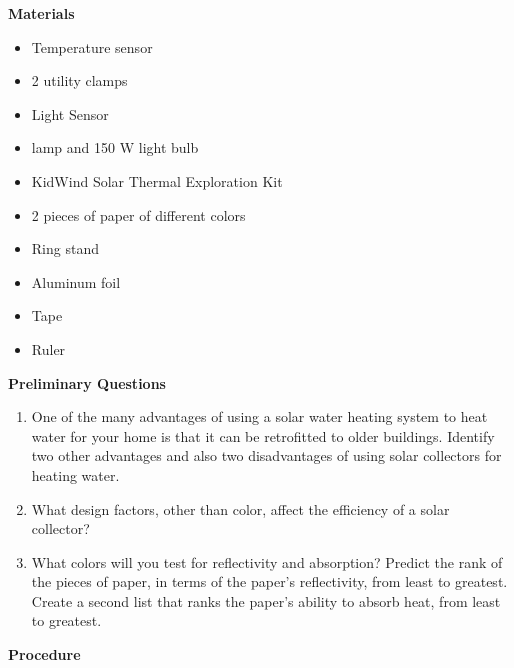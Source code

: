 \documentclass[english,twoside]{article}
\begin{document}
\textbf{Materials}
\begin{itemize}
	\item Temperature sensor
	\item 2 utility clamps
	\item Light Sensor	
	\item lamp and 150 W light bulb
	\item KidWind Solar Thermal Exploration Kit	
	\item 2 pieces of paper of different colors
	\item Ring stand	
	\item Aluminum foil
	\item Tape	
	\item Ruler
\end{itemize}
\newpage
\textbf{Preliminary Questions}
\begin{enumerate}
	\item One of the many advantages of using a solar water heating system to heat water for your home is that it can be retrofitted to older buildings. Identify two other advantages and also two disadvantages of using solar collectors for heating water.
	\answerspace{3.0in}
	\item What design factors, other than color, affect the efficiency of a solar collector?
	\answerspace{3.0in}
	\item What colors will you test for reflectivity and absorption? Predict the rank of the pieces of paper, in terms of the paper's reflectivity, from least to greatest. Create a second list that ranks the paper's ability to absorb heat, from least to greatest.
	\answerspace{4.0in}
\end{enumerate}

\textbf{Procedure}
\end{document}

